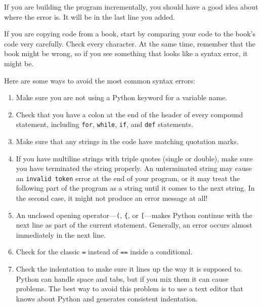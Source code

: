 \documentclass[10pt]{book}
\begin{document}
\begin{CJK}{UTF8}{gbsn}
If you are building the program incrementally, you should have
a good idea about where the error is.  It will be in the last
line you added.

If you are copying code from a book, start by comparing
your code to the book's code very carefully.  Check every character.
At the same time, remember that the book might be wrong, so
if you see something that looks like a syntax error, it might be.

Here are some ways to avoid the most common syntax errors:

\begin{enumerate}

\item Make sure you are not using a Python keyword for a variable name.

\item Check that you have a colon at the end of the header of every
compound statement, including {\tt for}, {\tt while},
{\tt if}, and {\tt def} statements.

\item Make sure that any strings in the code have matching
quotation marks.

\item If you have multiline strings with triple quotes (single or double), make
sure you have terminated the string properly.  An unterminated string
may cause an {\tt invalid token} error at the end of your program,
or it may treat the following part of the program as a string until it
comes to the next string.  In the second case, it might not produce an error
message at all!

\item An unclosed opening operator---\verb+(+, \verb+{+, or
  \verb+[+---makes Python continue with the next line as part of the
  current statement.  Generally, an error occurs almost immediately in
  the next line.

\item Check for the classic {\tt =} instead of {\tt ==} inside
a conditional.

\item Check the indentation to make sure it lines up the way it
is supposed to.  Python can handle space and tabs, but if you mix
them it can cause problems.  The best way to avoid this problem
is to use a text editor that knows about Python and generates
consistent indentation.


\end{enumerate}
\end{CJK}
\end{document}
